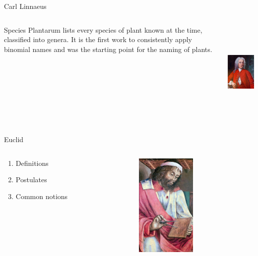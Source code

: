 \documentclass[10pt]{beamer}
\begin{document}
\begin{frame}{Carl Linnaeus}
    \begin{columns}
        \begin{column}{0.6\textwidth}
			Species Plantarum lists every species of plant known at the time, classified into genera. It is the first work to consistently apply binomial names and was the starting point for the naming of plants.
        \end{column}
        \begin{column}{0.4\textwidth}  %
                \begin{center}
					\includegraphics[height=5cm]{images/LinnaeusWeddingPortrait.jpg}
                \end{center}
        \end{column}
    \end{columns}
\end{frame}


\begin{frame}{Euclid}
	\begin{columns}
        \begin{column}{0.6\textwidth}
			\begin{enumerate}
				\item Definitions
				\item Postulates
				\item Common notions
			\end{enumerate}
		\end{column}
        \begin{column}{0.4\textwidth}  %
                \begin{center}
					\includegraphics[height=5cm]{images/euclid.jpg}
                \end{center}
        \end{column}
	\end{columns}
\end{frame}
\end{document}
